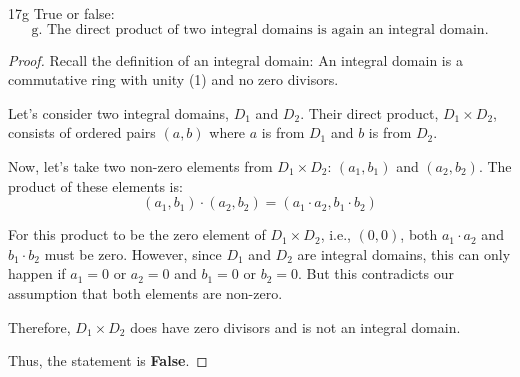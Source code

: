 \documentclass[12pt]{amsart}
\theoremstyle{definition}
\numberwithin{equation}{section}
\theoremstyle{plain}
\begin{document}
\vspace*{20pt}
\begin{exercise}{17g} True or false:\\
    \[\text{g. The direct product of two integral domains is again an integral domain.}\]
    \begin{proof}
    Recall the definition of an integral domain: An integral domain is a commutative ring with unity (1) and no zero divisors. 
        
    Let's consider two integral domains, \( D_1 \) and \( D_2 \). Their direct product, \( D_1 \times D_2 \), consists of ordered pairs \((a, b)\) where \( a \) is from \( D_1 \) and \( b \) is from \( D_2 \).
        
    Now, let's take two non-zero elements from \( D_1 \times D_2 \): \((a_1, b_1)\) and \((a_2, b_2)\). The product of these elements is:
    \[(a_1, b_1) \cdot (a_2, b_2) = (a_1 \cdot a_2, b_1 \cdot b_2)\]
        
    For this product to be the zero element of \( D_1 \times D_2 \), i.e., \((0, 0)\), both \( a_1 \cdot a_2 \) and \( b_1 \cdot b_2 \) must be zero. However, since \( D_1 \) and \( D_2 \) are integral domains, this can only happen if \( a_1 = 0 \) or \( a_2 = 0 \) and \( b_1 = 0 \) or \( b_2 = 0 \). But this contradicts our assumption that both elements are non-zero.
        
    Therefore, \( D_1 \times D_2 \) does have zero divisors and is not an integral domain.
        
    Thus, the statement is \textbf{False}.
    \end{proof}
\end{exercise}
\vspace*{20pt}
\end{document}
